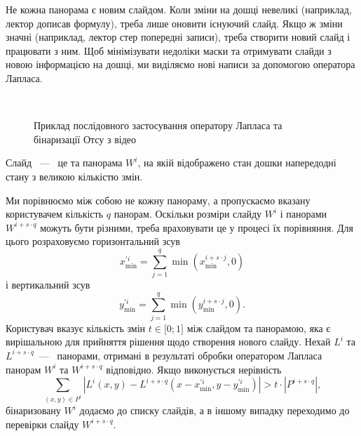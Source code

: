 Не кожна панорама є новим слайдом. Коли зміни на дошці невеликі
(наприклад, лектор дописав формулу), треба лише оновити існуючий слайд.
Якщо ж зміни значні (наприклад, лектор стер попередні записи), треба
створити новий слайд і працювати з ним. Щоб мінімізувати недоліки маски
та отримувати слайди з новою інформацією на дошці, ми виділяємо нові
написи за допомогою оператора Лапласа.
\begin{figure}[H]
  \centering
  \\
  \caption{Приклад послідовного застосування оператору Лапласа та бінаризації Отсу
    з відео \cite{video:central_theorem}
    \label{fig:binarized_slide_example}
  }
\end{figure}
\begin{definition}
  Слайд ~---~ це та панорама \(W^{i}\), на якій відображено стан дошки
  напередодні стану з великою кількістю змін.
\end{definition}
Ми порівнюємо між собою не
кожну панораму, а пропускаємо вказану користувачем кількість \(q\)
панорам. Оскільки розміри слайду \(W^{i}\) і панорами
\(W^{i + s \cdot q}\) можуть бути різними, треба враховувати це у
процесі їх порівняння. Для цього розраховуємо горизонтальний зсув
$$x_{\min}^{'i} = \sum_{j = 1}^{q}{\min\left( x_{\min}^{i + s \cdot j},0 \right)}$$
і вертикальний зсув
$$y_{\min}^{'i} = \sum_{j = 1}^{q}{\min\left( y_{\min}^{i + s \cdot j},0 \right)}.$$
Користувач вказує кількість змін \(t \in \lbrack 0;1\rbrack\) між
слайдом та панорамою, яка є вирішальною для прийняття рішення щодо
створення нового слайду. Нехай \(L^{i}\) та \(L^{i + s \cdot q}\)~---~
панорами, отримані в результаті обробки оператором Лапласа панорам \(W^{i}\) та
\(W^{i + s \cdot q}\) відповідно. Якщо виконується нерівність
\begin{equation*}
  \sum_{(x,y) \in P^{i}}^{}| L^{i}(x,y) - L^{i + s \cdot q}( x - x_{\min}^{'i},y - y_{\min}^{'i} ) | > t \cdot | P^{i + s \cdot q} |,
\end{equation*}
бінаризовану \(W^{i}\) додаємо до списку слайдів, а в іншому випадку переходимо до
перевірки слайду \(W^{i + s \cdot q}\).